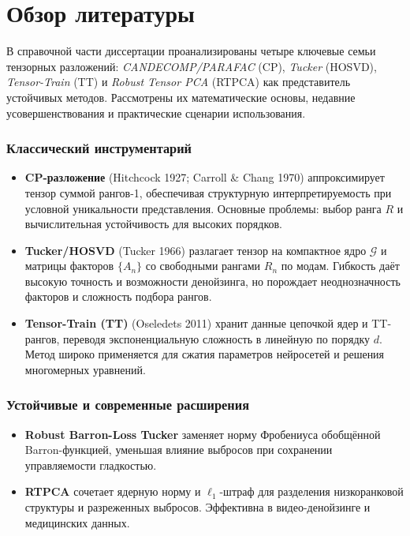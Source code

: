 \chapter{Обзор литературы}
\label{chap:lr}

В справочной части диссертации проанализированы четыре ключевые семьи тензорных разложений: \emph{CANDECOMP/PARAFAC} (CP), \emph{Tucker} (HOSVD), \emph{Tensor-Train} (TT) и \emph{Robust Tensor PCA} (RTPCA) как представитель устойчивых методов. Рассмотрены их математические основы, недавние усовершенствования и практические сценарии использования.

\subsection*{Классический инструментарий}

\begin{itemize}\setlength\itemsep{0.25em}
    \item \textbf{CP-разложение} (Hitchcock 1927; Carroll \& Chang 1970) аппроксимирует тензор суммой рангов-1, обеспечивая структурную интерпретируемость при условной уникальности представления. Основные проблемы: выбор ранга \(R\) и вычислительная устойчивость для высоких порядков.
    \item \textbf{Tucker/HOSVD} (Tucker 1966) разлагает тензор на компактное ядро \( \mathcal{G} \) и матрицы факторов \(\{A_n\}\) со свободными рангами \(R_n\) по модам. Гибкость даёт высокую точность и возможности денойзинга, но порождает неоднозначность факторов и сложность подбора рангов.
    \item \textbf{Tensor-Train (TT)} (Oseledets 2011) хранит данные цепочкой ядер и TT-рангов, переводя экспоненциальную сложность в линейную по порядку \(d\). Метод широко применяется для сжатия параметров нейросетей и решения многомерных уравнений.
\end{itemize}

\subsection*{Устойчивые и современные расширения}

\begin{itemize}\setlength\itemsep{0.25em}
    \item \textbf{Robust Barron-Loss Tucker} \cite{barron_loss_tensor_decomposition} заменяет норму Фробениуса обобщённой Barron-функцией, уменьшая влияние выбросов при сохранении управляемости гладкостью.
    \item \textbf{RTPCA} \cite{rtpca_method} сочетает ядерную норму и $\ell_1$-штраф для разделения низкоранковой структуры и разреженных выбросов. Эффективна в видео-денойзинге и медицинских данных.
\end{itemize}

